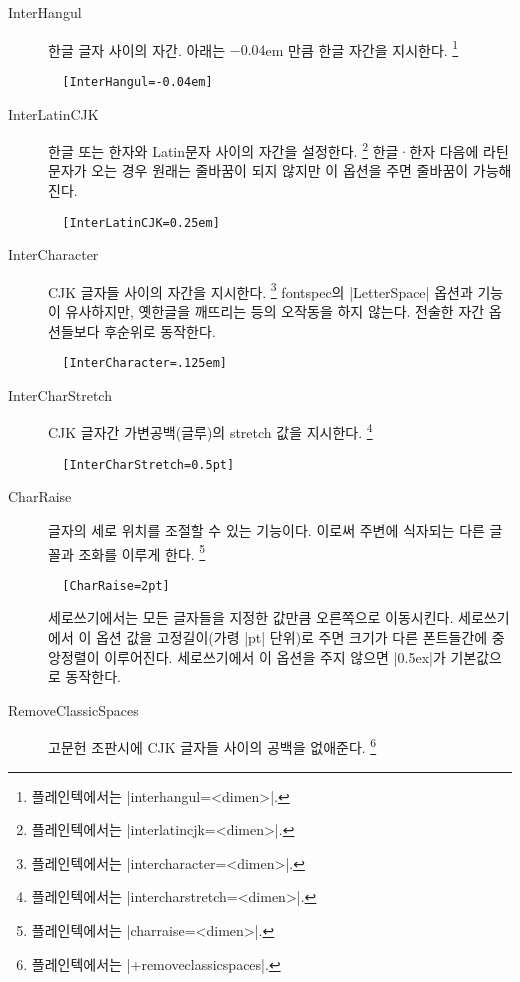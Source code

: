 \documentclass[a4paper]{article}
\begin{document}
\begin{description}
  \item[InterHangul] {한글 글자
    사이의 자간}.  아래는 $-0.04$em 만큼 한글 자간을 지시한다.%
    \footnote{%
      플레인텍에서는 |interhangul=<dimen>|. }
\begin{verbatim}
  [InterHangul=-0.04em]
\end{verbatim}

\item[InterLatinCJK] 한글 또는 한자와 Latin문자 사이의 자간을 설정한다.%
    \footnote{%
      플레인텍에서는 |interlatincjk=<dimen>|. }
    한글^^b7한자 다음에 라틴 문자가 오는 경우 원래는 줄바꿈이 되지 않지만
    이 옵션을 주면 줄바꿈이 가능해진다.
\begin{verbatim}
  [InterLatinCJK=0.25em]
\end{verbatim}

\item[InterCharacter] CJK 글자들 사이의 자간을 지시한다.%
  \footnote{%
    플레인텍에서는 |intercharacter=<dimen>|. }
  fontspec의 |LetterSpace| 옵션과 기능이 유사하지만, 옛한글을 깨뜨리는 등의
  오작동을 하지 않는다. 전술한 자간 옵션들보다 후순위로 동작한다.
\begin{verbatim}
  [InterCharacter=.125em]
\end{verbatim}

\item[InterCharStretch] CJK 글자간 가변공백{\small(글루)}의
  stretch 값을 지시한다.%
  \footnote{%
    플레인텍에서는 |intercharstretch=<dimen>|. }
\begin{verbatim}
  [InterCharStretch=0.5pt]
\end{verbatim}

\item[CharRaise] 글자의 세로 위치를
  { 조절}할 수 있는 기능이다.
  이로써 주변에 식자되는 다른 글꼴과 조화를 이루게 한다.%
  \footnote{%
    플레인텍에서는 |charraise=<dimen>|. }
\begin{verbatim}
  [CharRaise=2pt]
\end{verbatim}
  세로쓰기에서는 모든 글자들을 지정한 값만큼 오른쪽으로 이동시킨다.
  세로쓰기에서 이 옵션 값을 고정길이{\small(가령 |pt| 단위)}로 주면
  크기가 다른 폰트들간에 중앙정렬이 이루어진다.
  세로쓰기에서 이 옵션을 주지 않으면 |0.5ex|가 기본값으로 동작한다.

\item[RemoveClassicSpaces] 고문헌 조판시에 CJK 글자들 사이의 공백을 없애준다.%
  \footnote{%
    플레인텍에서는 |+removeclassicspaces|. }


\end{description}
\end{document}
